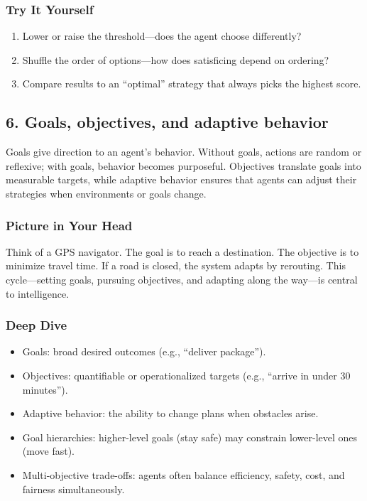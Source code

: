 \documentclass[
  letterpaper,
  DIV=11,
  numbers=noendperiod]{scrreprt}
\providecommand{\tightlist}{%
  \setlength{\itemsep}{0pt}\setlength{\parskip}{0pt}}
\begin{document}
\subsubsection{Try It Yourself}\label{try-it-yourself-4}

\begin{enumerate}
\def\labelenumi{\arabic{enumi}.}
\tightlist
\item
  Lower or raise the threshold---does the agent choose differently?
\item
  Shuffle the order of options---how does satisficing depend on
  ordering?
\item
  Compare results to an ``optimal'' strategy that always picks the
  highest score.
\end{enumerate}

\subsection{6. Goals, objectives, and adaptive
behavior}\label{goals-objectives-and-adaptive-behavior}

Goals give direction to an agent's behavior. Without goals, actions are
random or reflexive; with goals, behavior becomes purposeful. Objectives
translate goals into measurable targets, while adaptive behavior ensures
that agents can adjust their strategies when environments or goals
change.

\subsubsection{Picture in Your Head}\label{picture-in-your-head-5}

Think of a GPS navigator. The goal is to reach a destination. The
objective is to minimize travel time. If a road is closed, the system
adapts by rerouting. This cycle---setting goals, pursuing objectives,
and adapting along the way---is central to intelligence.

\subsubsection{Deep Dive}\label{deep-dive-5}

\begin{itemize}
\tightlist
\item
  Goals: broad desired outcomes (e.g., ``deliver package'').
\item
  Objectives: quantifiable or operationalized targets (e.g., ``arrive in
  under 30 minutes'').
\item
  Adaptive behavior: the ability to change plans when obstacles arise.
\item
  Goal hierarchies: higher-level goals (stay safe) may constrain
  lower-level ones (move fast).
\item
  Multi-objective trade-offs: agents often balance efficiency, safety,
  cost, and fairness simultaneously.
\end{itemize}
\end{document}
